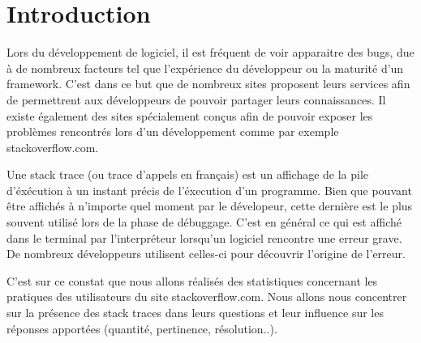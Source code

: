 \section{Introduction}
Lors du développement de logiciel, il est fréquent de voir apparaitre des bugs, due à de nombreux facteurs tel que l'expérience du développeur ou la maturité d'un framework. C'est dans ce but que de nombreux sites proposent leurs services afin de permettrent aux développeurs de pouvoir partager leurs connaissances. Il existe également des sites spécialement conçus afin de pouvoir exposer les problèmes rencontrés lors d'un développement comme par exemple stackoverflow.com. 

Une stack trace (ou trace d'appels en français) est un affichage de la pile d'éxécution à un instant précis de l'éxecution d'un programme. Bien que pouvant être affichés à n'importe quel moment par le dévelopeur, cette dernière est le plus souvent utilisé lors de la phase de débuggage. C'est en général ce qui est affiché dans le terminal par l'interpréteur lorsqu'un logiciel rencontre une erreur grave. De nombreux développeurs utilisent celles-ci pour découvrir l'origine de l'erreur. 

C'est sur ce constat que nous allons réalisés des statistiques concernant les pratiques des utilisateurs du site stackoverflow.com. Nous allons nous concentrer sur la présence des stack traces dans leurs questions et leur influence sur les réponses apportées (quantité, pertinence, résolution..).

